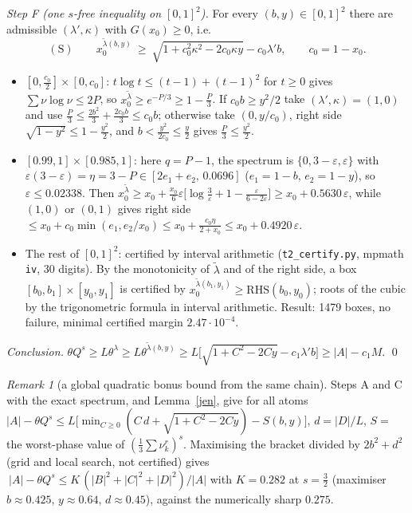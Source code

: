 \documentclass[11pt]{article}
\theoremstyle{remark}\newtheorem{remark}[theorem]{Remark}
\begin{document}
\emph{Step F (one $s$-free inequality on $[0,1]^2$).}  For every $(b,y)\in[0,1]^2$ there are admissible $(\lambda',\kappa)$ with $G(x_0)\ge0$, i.e.
\[(\mathrm S)\qquad x_0^{\tilde\lambda(b,y)}\ \ge\ \sqrt{1+c_0^2\kappa^2-2c_0\kappa y}-c_0\lambda'b,\qquad c_0=1-x_0 .\]
\begin{itemize}
\item[(F0)] $[0,\frac{c_0}2]\times[0,c_0]$: $t\log t\le(t-1)+(t-1)^2$ for $t\ge0$ gives $\sum\nu\log\nu\le2P$, so $x_0^{\tilde\lambda}\ge e^{-P/3}\ge1-\frac P3$.
If $c_0b\ge y^2/2$ take $(\lambda',\kappa)=(1,0)$ and use $\frac P3\le\frac{2b^2}3+\frac{2c_0b}3\le c_0b$; otherwise take $(0,y/c_0)$, right side $\sqrt{1-y^2}\le1-\frac{y^2}2$,
and $b<\frac{y^2}{2c_0}\le\frac y2$ gives $\frac P3\le\frac{y^2}2$.
\item[(F1)] $[0.99,1]\times[0.985,1]$: here $q=P-1$, the spectrum is $\{0,3-\varepsilon,\varepsilon\}$ with $\varepsilon(3-\varepsilon)=\eta=3-P\in[2e_1+e_2,\,0.0696]$
($e_1=1-b$, $e_2=1-y$), so $\varepsilon\le0.02338$.  Then $x_0^{\tilde\lambda}\ge x_0+\frac{x_0}6\varepsilon\big[\log\frac3\varepsilon+1-\frac{\varepsilon}{6-2\varepsilon}\big]\ge x_0+0.5630\,\varepsilon$, while
$(1,0)$ or $(0,1)$ gives right side $\le x_0+c_0\min(e_1,e_2/x_0)\le x_0+\frac{c_0\eta}{2+x_0}\le x_0+0.4920\,\varepsilon$.
\item[(F2)] The rest of $[0,1]^2$: certified by interval arithmetic (\texttt{t2\_certify.py}, mpmath \texttt{iv}, 30 digits).  By the monotonicity of
$\tilde\lambda$ and of the right side, a box $[b_0,b_1]\times[y_0,y_1]$ is certified by $x_0^{\tilde\lambda(b_1,y_1)}\ge\text{RHS}(b_0,y_0)$; roots of the cubic by the
trigonometric formula in interval arithmetic.  Result: 1479 boxes, no failure, minimal certified margin $2.47\cdot10^{-4}$.
\end{itemize}
\emph{Conclusion.}  $\theta Q^s\ge L\theta^{\lambda}\ge L\theta^{\tilde\lambda(b,y)}\ge L\big[\sqrt{1+C^2-2Cy}-c_1\lambda'b\big]\ge|A|-c_1M$. \qed

\begin{remark}[a global quadratic bonus bound from the same chain]
Steps A and C with the exact spectrum, and Lemma~\ref{jen}, give for all atoms
$|A|-\theta Q^s\le L\big[\min_{C\ge0}(C\,d+\sqrt{1+C^2-2Cy})-S(b,y)\big]$, $d=|D|/L$, $S=$ the worst-phase value of $(\frac13\sum\nu_k^r)^s$.
Maximising the bracket divided by $2b^2+d^2$ (grid and local search, not certified) gives
$\ |A|-\theta Q^s\le K\,(|B|^2+|C|^2+|D|^2)/|A|$ with $K=0.282$ at $s=\frac32$ (maximiser $b\approx0.425$, $y\approx0.64$, $d\approx0.45$),
against the numerically sharp $0.275$.
\end{remark}
\end{document}
